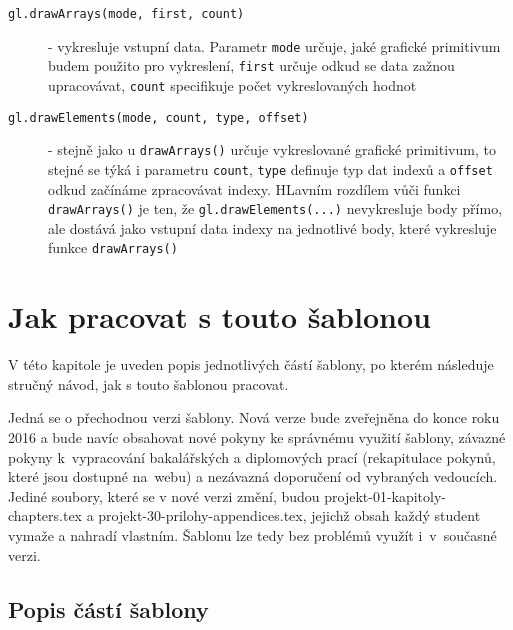 \begin{description}
	
	\item[\texttt{gl.drawArrays(mode, first, count)}] - vykresluje vstupní data. Parametr \texttt{mode} určuje, jaké grafické primitivum budem použito pro vykreslení, \texttt{first} určuje odkud se data zažnou upracovávat, \texttt{count} specifikuje počet vykreslovaných hodnot
	
	\item[\texttt{gl.drawElements(mode, count, type, offset)}] - stejně jako u \texttt{drawArrays()} určuje vykreslované grafické primitivum, to stejné se týká i parametru \texttt{count}, \texttt{type} definuje typ dat indexů a \texttt{offset} odkud začínáme zpracovávat indexy. HLavním rozdílem vůči funkci \texttt{drawArrays()} je ten, že \texttt{gl.drawElements(...)} nevykresluje body přímo, ale dostává jako vstupní data indexy na jednotlivé body, které vykresluje funkce \texttt{drawArrays()}
	
	\end{description}

\newpage

\chapter{Jak pracovat s touto šablonou}
\label{jak}

V této kapitole je uveden popis jednotlivých částí šablony, po kterém následuje stručný návod, jak s touto šablonou pracovat. 

Jedná se o přechodnou verzi šablony. Nová verze bude zveřejněna do konce roku 2016 a bude navíc obsahovat nové pokyny ke správnému využití šablony, závazné pokyny k~vypracování bakalářských a diplomových prací (rekapitulace pokynů, které jsou dostupné na~webu) a nezávazná doporučení od vybraných vedoucích. Jediné soubory, které se v nové verzi změní, budou projekt-01-kapitoly-chapters.tex a projekt-30-prilohy-appendices.tex, jejichž obsah každý student vymaže a nahradí vlastním. Šablonu lze tedy bez problémů využít i~v~současné verzi.

\section*{Popis částí šablony}

